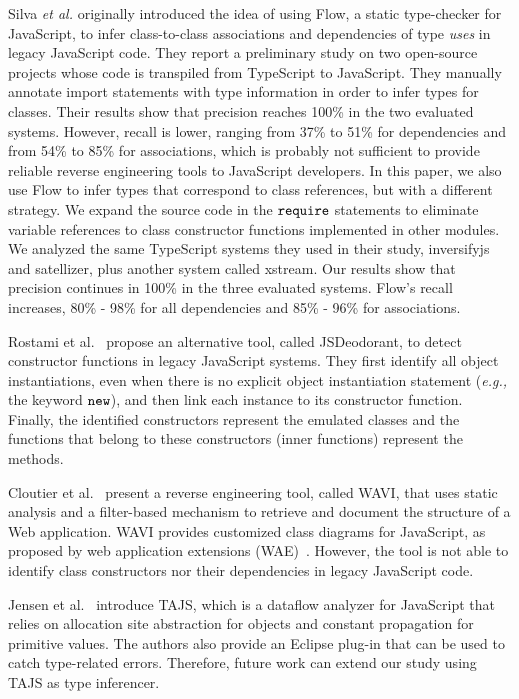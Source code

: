 \documentclass[review]{elsarticle}
\newcommand{\mcode}[1]{$\tt #1$}
\begin{document}
Silva \emph{et al.} \cite{sanerera2017} originally introduced the idea of using Flow, a static type-checker for JavaScript, to infer class-to-class associations and dependencies of type \textit{uses} in legacy JavaScript code. They report a preliminary study on two open-source projects whose code is transpiled from TypeScript to JavaScript. They manually annotate import statements with type information in order to infer types for classes. Their results show that precision reaches 100\% in the two evaluated systems. However, recall is lower, ranging from 37\% to 51\% for dependencies and from 54\% to 85\% for associations, which is probably not sufficient to provide reliable reverse engineering tools to JavaScript developers. In this paper, we also use Flow to infer types that correspond to class references, but with a different strategy. We expand the source code in the \mcode{require} statements to eliminate variable references to class constructor functions implemented in other modules. We analyzed the same TypeScript systems they used in their study, {\sc inversifyjs} and {\sc satellizer}, plus another system called {\sc xstream}. Our results show that precision continues in 100\% in the three evaluated systems. Flow's recall increases, 80\% - 98\% for all dependencies and 85\% - 96\% for associations.

Rostami et al.~\cite{rostami2016} propose an alternative tool, called JSDeodorant, to detect constructor functions in legacy JavaScript systems. They first identify all object instantiations, even when there is no explicit object instantiation statement (\emph{e.g.,} the keyword \mcode{new}), and then link each instance to its constructor function. Finally, the identified constructors represent the emulated classes and the functions that belong to these constructors (inner functions) represent the methods.

Cloutier et al.~\cite{wavi2016} present a reverse engineering tool, called WAVI, that uses static analysis and a filter-based mechanism to retrieve and document the structure of a Web
application. WAVI provides customized class diagrams for JavaScript, as proposed by web application extensions (WAE)~\cite{wae-conallen-2002}. However, the tool is not able to identify class constructors nor their dependencies in legacy JavaScript code. 

Jensen et al.~\cite{tajs2009,lazypropagation2010} introduce TAJS, which is a dataflow analyzer for JavaScript that relies on allocation site abstraction for objects and constant propagation for primitive values. The authors also provide an Eclipse plug-in that can be used to catch type-related errors. Therefore, future work can extend our study using TAJS as type inferencer.
\end{document}
